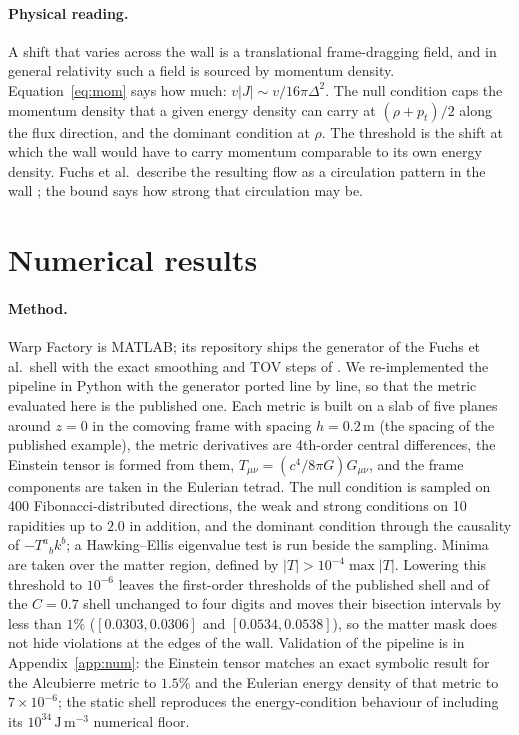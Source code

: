 \documentclass[11pt,a4paper]{article}
\theoremstyle{remark}
\begin{document}
\paragraph{Physical reading.} A shift that varies across the wall is a translational frame-dragging field, and in general relativity such a field is sourced by momentum density. Equation~\eqref{eq:mom} says how much: $v|J| \sim v/16\pi\Delta^2$. The null condition caps the momentum density that a given energy density can carry at $(\rho+p_t)/2$ along the flux direction, and the dominant condition at $\rho$. The threshold is the shift at which the wall would have to carry momentum comparable to its own energy density. Fuchs et al.\ describe the resulting flow as a circulation pattern in the wall \cite{Fuchs2024}; the bound says how strong that circulation may be.

\section{Numerical results}\label{sec:num}

\paragraph{Method.} Warp Factory \cite{Helmerich2024} is MATLAB; its repository ships the generator of the Fuchs et al.\ shell with the exact smoothing and TOV steps of \cite{Fuchs2024}. We re-implemented the pipeline in Python with the generator ported line by line, so that the metric evaluated here is the published one. Each metric is built on a slab of five planes around $z = 0$ in the comoving frame with spacing $h = 0.2\,\mathrm{m}$ (the spacing of the published example), the metric derivatives are 4th-order central differences, the Einstein tensor is formed from them, $T_{\mu\nu} = (c^4/8\pi G)G_{\mu\nu}$, and the frame components are taken in the Eulerian tetrad. The null condition is sampled on 400 Fibonacci-distributed directions, the weak and strong conditions on 10 rapidities up to $2.0$ in addition, and the dominant condition through the causality of $-T^a{}_b k^b$; a Hawking--Ellis eigenvalue test is run beside the sampling. Minima are taken over the matter region, defined by $|T| > 10^{-4}\max|T|$. Lowering this threshold to $10^{-6}$ leaves the first-order thresholds of the published shell and of the $C = 0.7$ shell unchanged to four digits and moves their bisection intervals by less than $1\%$ ($[0.0303, 0.0306]$ and $[0.0534, 0.0538]$), so the matter mask does not hide violations at the edges of the wall. Validation of the pipeline is in Appendix~\ref{app:num}: the Einstein tensor matches an exact symbolic result for the Alcubierre metric to $1.5\%$ and the Eulerian energy density of that metric to $7\times10^{-6}$; the static shell reproduces the energy-condition behaviour of \cite{Fuchs2024} including its $10^{34}\,\mathrm{J\,m^{-3}}$ numerical floor.
\end{document}
